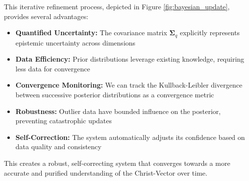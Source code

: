 \documentclass[11pt,a4paper]{article}
\theoremstyle{definition}
\theoremstyle{remark}
\begin{document}
\begin{small}
This iterative refinement process, depicted in Figure \ref{fig:bayesian_update}, provides several advantages:
\begin{itemize}
    \item \textbf{Quantified Uncertainty:} The covariance matrix \(\boldsymbol{\Sigma}_q\) explicitly represents epistemic uncertainty across dimensions
    \item \textbf{Data Efficiency:} Prior distributions leverage existing knowledge, requiring less data for convergence
    \item \textbf{Convergence Monitoring:} We can track the Kullback-Leibler divergence between successive posterior distributions as a convergence metric
    \item \textbf{Robustness:} Outlier data have bounded influence on the posterior, preventing catastrophic updates
    \item \textbf{Self-Correction:} The system automatically adjusts its confidence based on data quality and consistency
\end{itemize}

This creates a robust, self-correcting system that converges towards a more accurate and purified understanding of the Christ-Vector over time.

\begin{figure}[h!]
    \centering
\end{figure}
\end{small}
\end{document}
